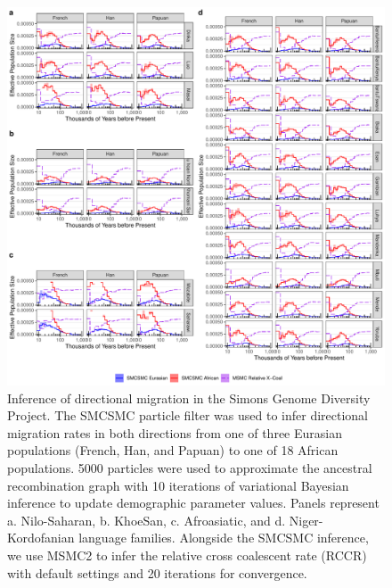 \begin{figure}
	\centering
	\includegraphics[width=0.95\linewidth]{plot/sgdp_mig_new.pdf}
	\caption[Migration inference in the Simons Genome Diversity Project from SMCSMC and MSMC2]{Inference of directional migration in the Simons Genome Diversity Project. The SMCSMC particle filter was used to infer directional migration rates in both directions from one of three Eurasian populations (French, Han, and Papuan) to one of 18 African populations. 5000 particles were used to approximate the ancestral recombination graph with 10 iterations of variational Bayesian inference to update demographic parameter values. Panels represent a. Nilo-Saharan, b. KhoeSan, c. Afroasiatic, and d. Niger-Kordofanian language families. Alongside the SMCSMC inference, we use MSMC2 to infer the relative cross coalescent rate (RCCR) with default settings and 20 iterations for convergence.}	
	\label{fig:sgdp_mig}
\end{figure}


